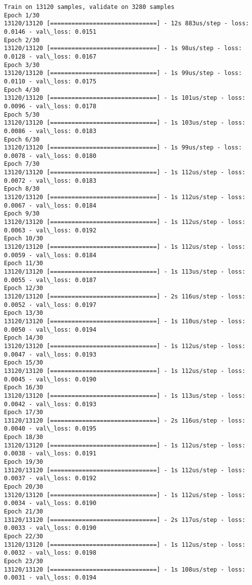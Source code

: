 \documentclass[11pt]{article}
\begin{document}
    \begin{Verbatim}[commandchars=\\\{\}]
Train on 13120 samples, validate on 3280 samples
Epoch 1/30
13120/13120 [==============================] - 12s 883us/step - loss: 0.0146 - val\_loss: 0.0151
Epoch 2/30
13120/13120 [==============================] - 1s 98us/step - loss: 0.0128 - val\_loss: 0.0167
Epoch 3/30
13120/13120 [==============================] - 1s 99us/step - loss: 0.0110 - val\_loss: 0.0175
Epoch 4/30
13120/13120 [==============================] - 1s 101us/step - loss: 0.0096 - val\_loss: 0.0178
Epoch 5/30
13120/13120 [==============================] - 1s 103us/step - loss: 0.0086 - val\_loss: 0.0183
Epoch 6/30
13120/13120 [==============================] - 1s 99us/step - loss: 0.0078 - val\_loss: 0.0180
Epoch 7/30
13120/13120 [==============================] - 1s 112us/step - loss: 0.0072 - val\_loss: 0.0183
Epoch 8/30
13120/13120 [==============================] - 1s 112us/step - loss: 0.0067 - val\_loss: 0.0184
Epoch 9/30
13120/13120 [==============================] - 1s 112us/step - loss: 0.0063 - val\_loss: 0.0192
Epoch 10/30
13120/13120 [==============================] - 1s 112us/step - loss: 0.0059 - val\_loss: 0.0184
Epoch 11/30
13120/13120 [==============================] - 1s 113us/step - loss: 0.0055 - val\_loss: 0.0187
Epoch 12/30
13120/13120 [==============================] - 2s 116us/step - loss: 0.0052 - val\_loss: 0.0197
Epoch 13/30
13120/13120 [==============================] - 1s 110us/step - loss: 0.0050 - val\_loss: 0.0194
Epoch 14/30
13120/13120 [==============================] - 1s 112us/step - loss: 0.0047 - val\_loss: 0.0193
Epoch 15/30
13120/13120 [==============================] - 1s 112us/step - loss: 0.0045 - val\_loss: 0.0190
Epoch 16/30
13120/13120 [==============================] - 1s 113us/step - loss: 0.0042 - val\_loss: 0.0193
Epoch 17/30
13120/13120 [==============================] - 2s 116us/step - loss: 0.0040 - val\_loss: 0.0195
Epoch 18/30
13120/13120 [==============================] - 1s 112us/step - loss: 0.0038 - val\_loss: 0.0191
Epoch 19/30
13120/13120 [==============================] - 1s 112us/step - loss: 0.0037 - val\_loss: 0.0192
Epoch 20/30
13120/13120 [==============================] - 1s 112us/step - loss: 0.0034 - val\_loss: 0.0190
Epoch 21/30
13120/13120 [==============================] - 2s 117us/step - loss: 0.0033 - val\_loss: 0.0190
Epoch 22/30
13120/13120 [==============================] - 1s 112us/step - loss: 0.0032 - val\_loss: 0.0198
Epoch 23/30
13120/13120 [==============================] - 1s 108us/step - loss: 0.0031 - val\_loss: 0.0194

\end{Verbatim}
\end{document}

